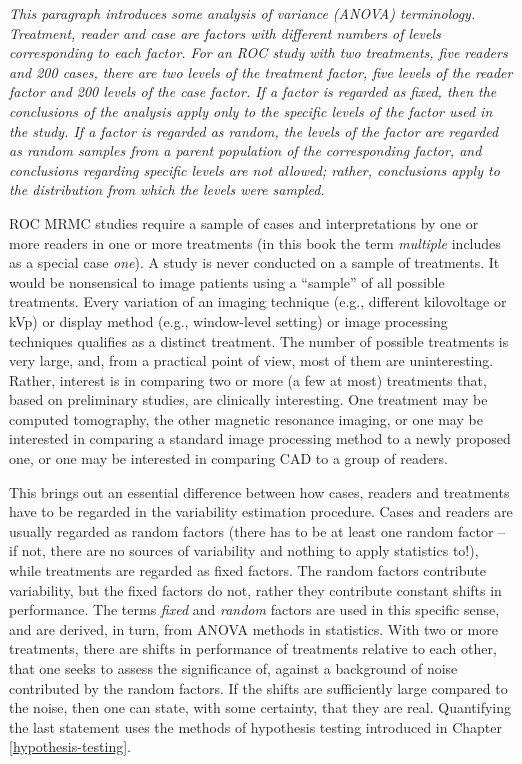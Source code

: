 \documentclass[
]{book}
\begin{document}
\emph{This paragraph introduces some analysis of variance (ANOVA) terminology. Treatment, reader and case are factors with different numbers of levels corresponding to each factor. For an ROC study with two treatments, five readers and 200 cases, there are two levels of the treatment factor, five levels of the reader factor and 200 levels of the case factor. If a factor is regarded as fixed, then the conclusions of the analysis apply only to the specific levels of the factor used in the study. If a factor is regarded as random, the levels of the factor are regarded as random samples from a parent population of the corresponding factor, and conclusions regarding specific levels are not allowed; rather, conclusions apply to the distribution from which the levels were sampled.}

ROC MRMC studies require a sample of cases and interpretations by one or more readers in one or more treatments (in this book the term \emph{multiple} includes as a special case \emph{one}). A study is never conducted on a sample of treatments. It would be nonsensical to image patients using a ``sample'' of all possible treatments. Every variation of an imaging technique (e.g., different kilovoltage or kVp) or display method (e.g., window-level setting) or image processing techniques qualifies as a distinct treatment. The number of possible treatments is very large, and, from a practical point of view, most of them are uninteresting. Rather, interest is in comparing two or more (a few at most) treatments that, based on preliminary studies, are clinically interesting. One treatment may be computed tomography, the other magnetic resonance imaging, or one may be interested in comparing a standard image processing method to a newly proposed one, or one may be interested in comparing CAD to a group of readers.

This brings out an essential difference between how cases, readers and treatments have to be regarded in the variability estimation procedure. Cases and readers are usually regarded as random factors (there has to be at least one random factor -- if not, there are no sources of variability and nothing to apply statistics to!), while treatments are regarded as fixed factors. The random factors contribute variability, but the fixed factors do not, rather they contribute constant shifts in performance. The terms \emph{fixed} and \emph{random} factors are used in this specific sense, and are derived, in turn, from ANOVA methods in statistics. With two or more treatments, there are shifts in performance of treatments relative to each other, that one seeks to assess the significance of, against a background of noise contributed by the random factors. If the shifts are sufficiently large compared to the noise, then one can state, with some certainty, that they are real. Quantifying the last statement uses the methods of hypothesis testing introduced in Chapter \ref{hypothesis-testing}.
\end{document}
